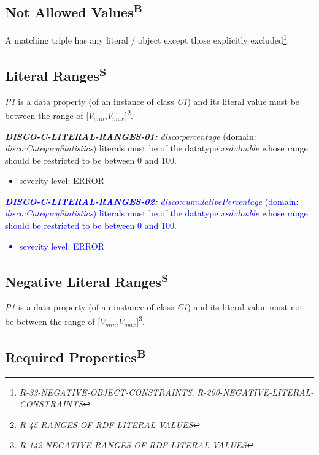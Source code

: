 \documentclass{llncs}
\begin{document}
\subsection{Not Allowed Values\textsuperscript{B}}

A matching triple has any literal / object except those explicitly excluded\footnote{\emph{R-33-NEGATIVE-OBJECT-CONSTRAINTS}, \emph{R-200-NEGATIVE-LITERAL-CONSTRAINTS}}.

\subsection{Literal Ranges\textsuperscript{S}}

\emph{P1} is a data property (of an instance of class \emph{C1}) and its literal value must be between the range of [$V_{min}$,$V_{max}$]\footnote{{\em R-45-RANGES-OF-RDF-LITERAL-VALUES}}.

\begin{itemize}
	\item \textbf{{\em DISCO-C-LITERAL-RANGES-01:}}
{\em disco:percentage} (domain: {\em disco:CategoryStatistics}) literals must be of the datatype {\em xsd:double} whose range should be restricted to be between 0 and 100.
	\begin{itemize}
		\item severity level: ERROR
	\end{itemize}
	
	\textcolor{blue}{
	\item \textbf{{\em DISCO-C-LITERAL-RANGES-02:}}
{\em disco:cumulativePercentage} (domain: {\em disco:CategoryStatistics}) literals must be of the datatype {\em xsd:double} whose range should be restricted to be between 0 and 100.
	\begin{itemize}
		\item severity level: ERROR
	\end{itemize}
	}
	
\end{itemize}

\subsection{Negative Literal Ranges\textsuperscript{S}}

\emph{P1} is a data property (of an instance of class \emph{C1}) and its literal value must not be between the range of [$V_{min}$,$V_{max}$]\footnote{{\em R-142-NEGATIVE-RANGES-OF-RDF-LITERAL-VALUES}}.

\subsection{Required Properties\textsuperscript{B}}
\end{document}
